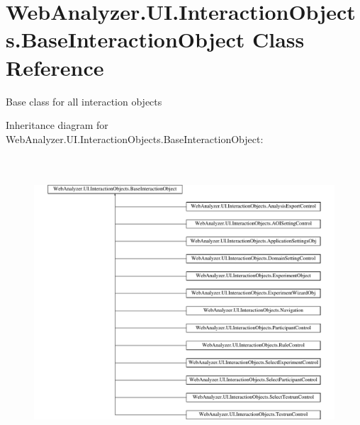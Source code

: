 \hypertarget{class_web_analyzer_1_1_u_i_1_1_interaction_objects_1_1_base_interaction_object}{}\section{Web\+Analyzer.\+U\+I.\+Interaction\+Objects.\+Base\+Interaction\+Object Class Reference}
\label{class_web_analyzer_1_1_u_i_1_1_interaction_objects_1_1_base_interaction_object}


Base class for all interaction objects  


Inheritance diagram for Web\+Analyzer.\+U\+I.\+Interaction\+Objects.\+Base\+Interaction\+Object\+:\begin{figure}[H]
\begin{center}
\leavevmode
\includegraphics[height=10.919220cm]{class_web_analyzer_1_1_u_i_1_1_interaction_objects_1_1_base_interaction_object}
\end{center}
\end{figure}
